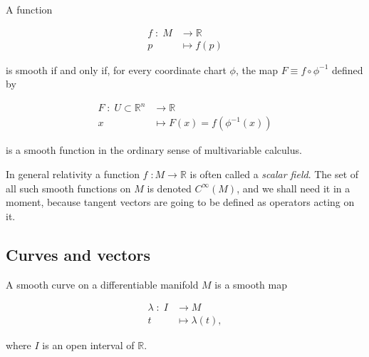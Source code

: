         \begin{myDef}
            A function

            \begin{equation}
                \begin{split}
                    f\;:\;M &\longrightarrow \mathbb{R}\\
                    p &\longmapsto f(p)
                \end{split}
            \end{equation}

            is smooth if and only if, for every coordinate chart $\phi$, the map $F \equiv f  \circ \phi^{-1}$ defined by

            \begin{equation}
                \begin{split}
                    F\;:\;U \subset \mathbb{R}^n &\longrightarrow \mathbb{R}\\
                    x &\longmapsto F(x) = f\left(\phi^{-1}(x)\right)
                \end{split}
            \end{equation}

            is a smooth function in the ordinary sense of multivariable calculus.
        \end{myDef}

        In general relativity a function $f\;:M \rightarrow \mathbb{R}$ is often called a \textit{scalar field}. The set of all such smooth functions on $M$ is denoted $C^{\infty}(M)$, and we shall need it in a moment, because tangent vectors are going to be defined as operators acting on it.

    \subsection{Curves and vectors}

        \begin{myDef}
            A smooth curve on a differentiable manifold $M$ is a smooth map

            \begin{equation}
                \begin{split}
                    \lambda\;:\;I &\longrightarrow M\\
                    t &\longmapsto \lambda(t),
                \end{split}
            \end{equation}

            where $I$ is an open interval of $\mathbb{R}$.
        \end{myDef}

